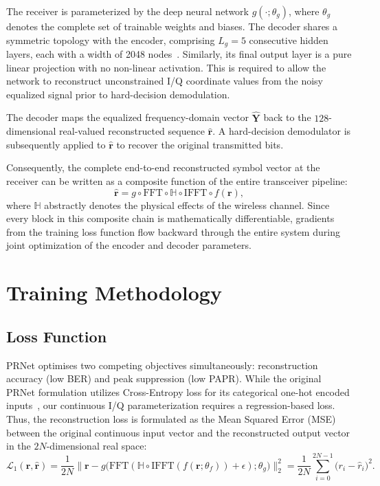 The receiver is parameterized by the deep neural network $g(\cdot; \theta_g)$, where $\theta_g$ denotes the complete set of trainable weights and biases. The decoder shares a symmetric topology with the encoder, comprising $L_g = 5$ consecutive hidden layers, each with a width of 2048 nodes~\cite{kim2017novel}. Similarly, its final output layer is a pure linear projection with no non-linear activation. This is required to allow the network to reconstruct unconstrained I/Q coordinate values from the noisy equalized signal prior to hard-decision demodulation.

The decoder maps the equalized frequency-domain vector $\hat{\bm{Y}}$ back to the $128$-dimensional real-valued reconstructed sequence $\hat{\bm{r}}$. A hard-decision demodulator is subsequently applied to $\hat{\bm{r}}$ to recover the original transmitted bits.

Consequently, the complete end-to-end reconstructed symbol vector at the receiver can be written as a composite function of the entire transceiver pipeline:
\begin{equation*}
    \hat{\bm{r}} = g \circ \mathrm{FFT} \circ \mathbb{H} \circ \mathrm{IFFT} \circ f(\bm{r}),
\end{equation*}
where $\mathbb{H}$ abstractly denotes the physical effects of the wireless channel. Since every block in this composite chain is mathematically differentiable, gradients from the training loss function flow backward through the entire system during joint optimization of the encoder and decoder parameters.

\section{Training Methodology}
\label{sec:training}

\subsection{Loss Function}

PRNet optimises two competing objectives simultaneously: reconstruction accuracy (low BER) and peak suppression (low PAPR). While the original PRNet formulation utilizes Cross-Entropy loss for its categorical one-hot encoded inputs~\cite{kim2017novel}, our continuous I/Q parameterization requires a regression-based loss. Thus, the reconstruction loss is formulated as the Mean Squared Error (MSE) between the original continuous input vector and the reconstructed output vector in the $2N$-dimensional real space:
\begin{equation*}
    \mathcal{L}_1(\bm{r},\hat{\bm{r}})
    = \frac{1}{2N}\bigl\|\bm{r} - g\bigl(\mathrm{FFT}(\mathbb{H} \circ \mathrm{IFFT}(f(\bm{r}; \theta_f)) + \epsilon); \theta_g\bigr)\bigr\|_2^2
    = \frac{1}{2N}\sum_{i=0}^{2N-1}\bigl(r_i - \hat{r}_i\bigr)^2.
\end{equation*}

